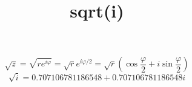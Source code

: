 \documentclass[12pt]{article}
\begin{document}
\title{sqrt(i)}
\maketitle
\[\sqrt{z}=\sqrt{re^{i\varphi}}=\sqrt{r}e^{i\varphi/2}=\sqrt{r}\left(\cos\frac{\varphi}{2}+i\sin\frac{\varphi}{2}\right)\]
\[\sqrt{i}=0.707106781186548+0.707106781186548i\]
\end{document}
